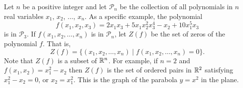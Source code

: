 \begin{comment}

\ExerciseSolution

\ba

\item Let $m \in \Z$ and suppose that $m$ is in $B_1 \cap B_2$ for some $B_1$ and $B_2$ in $\B$. Consider the case where $m$ is odd. Then $m \in B(m)$, $m \in B(m+1)$ and $m \in B(m-1)$. So $B_1$ and $B_2$ are one of $B(m)$, $B(m-1)$, and $B(m+1)$. In any case, $B(m)$ is then a subset of $B_1 \cap B_2$. 

Now consider the case where $m$ is even. Then $m \in B_(m)$ only. So $B_1 = B_2 = B(m)$, and $B(m) \subseteq B_1 \cap B_2$. We conclude that $\B$ is a basis for a topology on $\Z$. 

\item 	
	\begin{enumerate}[i.]
	\item The smallest open set that contains $0$ is $B(0) = \{-1,0,1\}$. So $\{0\}$ is not an open set. 
	\item Since $\{1\} = B(1)$, it follows that $\{1\}$ is an open set. 
	\item Any basis set that contains $0$ or $2$, also contains $1$. So $\{0, 2\}$ is not an open set. 
	\item Since $\{1, 2, 3, 4, 5\} = B(2) \cup B(4)$, it follows that the set $\{1, 2, 3, 4, 5\}$ is open.
	\item We can write $\Z^+$ as $\bigcup_{n \in \Z^+} B(n)$, so $\Z^+$ is an open set. 
	\item The set of odd integers can be written as $\bigcup_{n \text{ odd}} B(n)$, so the set of odd integers is an open set. 
	
	 \end{enumerate}

\ea

\end{comment}

\item \label{ex:TS_Zariski} Let $n$ be a positive integer and let $\mathcal{P}_n$ be the collection of all polynomials in $n$ real variables $x_1$, $x_2$, $\ldots$, $x_n$.  As a specific example, the polynomial 
\[f(x_1,x_2,x_3) = 2x_1x_3 + 5x_1x_2^2x_3^4 - x_2 + 10x_1^5x_3\]
is in $\mathcal{P}_3$. If $f(x_1, x_2, \ldots, x_n)$ is in $\mathcal{P}_n$, let $Z(f)$ be the set of zeros of the polynomial $f$. That is, 
\[Z(f) = \{(x_1, x_2, \ldots, x_n) \mid f(x_1,x_2, \ldots, x_n) = 0\}.\]
Note that $Z(f)$ is a subset of $\mathbb{R}^n$. For example, if $n=2$ and $f(x_1,x_2) = x_1^2 - x_2$ then $Z(f)$ is the set of ordered pairs in $\mathbb{R}^2$ satisfying $x_1^2-x_2 = 0$, or $x_2 = x_1^2$. This is the graph of the parabola $y=x^2$ in the plane. 

